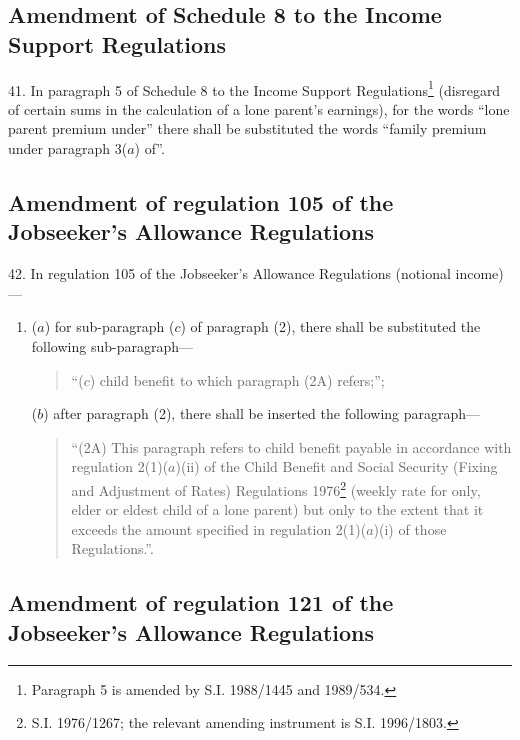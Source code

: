 \documentclass[12pt,a4paper]{article}
\begin{document}
\subsection[41. Amendment of Schedule 8 to the Income Support Regulations]{Amendment of Schedule 8 to the Income Support Regulations}

41.  In paragraph 5 of Schedule 8 to the Income Support Regulations\footnote{\frenchspacing Paragraph 5 is amended by S.I. 1988/1445 and 1989/534.} (disregard of certain sums in the calculation of a lone parent’s earnings), for the words “lone parent premium under” there shall be substituted the words “family premium under paragraph 3($a$) of”.

\subsection[42. Amendment of regulation 105 of the Jobseeker’s Allowance Regulations]{Amendment of regulation 105 of the Jobseeker’s Allowance Regulations}

42.  In regulation 105 of the Jobseeker’s Allowance Regulations (notional income)—
\begin{enumerate}\item[]
($a$) for sub-paragraph ($c$) of paragraph (2), there shall be substituted the following sub-paragraph—
\begin{quotation}
“($c$) child benefit to which paragraph (2A) refers;”;
\end{quotation}

($b$) after paragraph (2), there shall be inserted the following paragraph—
\begin{quotation}
“(2A) This paragraph refers to child benefit payable in accordance with regulation 2(1)($a$)(ii) of the Child Benefit and Social Security (Fixing and Adjustment of Rates) Regulations 1976\footnote{\frenchspacing S.I. 1976/1267; the relevant amending instrument is S.I. 1996/1803.} (weekly rate for only, elder or eldest child of a lone parent) but only to the extent that it exceeds the amount specified in regulation 2(1)($a$)(i) of those Regulations.”.
\end{quotation}
\end{enumerate}

\subsection[43. Amendment of regulation 121 of the Jobseeker’s Allowance Regulations]{Amendment of regulation 121 of the Jobseeker’s Allowance Regulations}
\end{document}
